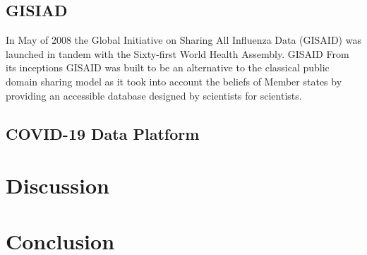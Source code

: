 \documentclass{article}
\begin{document}
\hypertarget{gisiad}{%
\subsection{GISIAD}\label{gisiad}}

In May of 2008 the Global Initiative on Sharing All Influenza Data
(GISAID) was launched in tandem with the Sixty-first World Health
Assembly. GISAID From its inceptions GISAID was built to be an
alternative to the classical public domain sharing model as it took into
account the beliefs of Member states by providing an accessible database
designed by scientists for scientists.

\hypertarget{covid-19-data-platform}{%
\subsection{COVID-19 Data Platform}\label{covid-19-data-platform}}

\hypertarget{discussion}{%
\section{Discussion}\label{discussion}}

\hypertarget{conclusion}{%
\section{Conclusion}\label{conclusion}}



\end{document}

